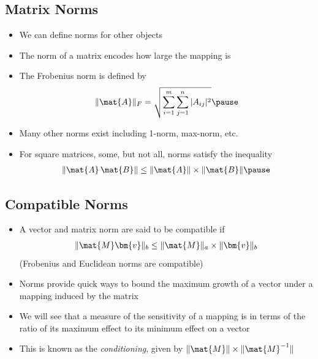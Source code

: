 \begin{slide}
\section[-2]{Matrix Norms}

\begin{PauseHighLight}
  \begin{itemize}
  \item We can define norms for other objects\pause
  \item The norm of a matrix encodes how large the mapping is\pause
  \item The Frobenius norm is defined by
    \begin{align*}
      \| \mat{A} \|_F = \sqrt{\sum_{i=1}^m \sum_{j=1}^n |A_{ij}|^2}\pause
    \end{align*}
  \item Many other norms exist including 1-norm, max-norm, etc.\pause
  \item For square matrices, some, but not all, norms satisfy the
    inequality
    \begin{align*}
      \| \mat{A}\,\mat{B} \| \leq \| \mat{A} \| \times \| \mat{B} \|\pause
    \end{align*}
  \end{itemize}
\end{PauseHighLight}

\end{slide}


\begin{slide}
\section[-2]{Compatible Norms}

\begin{PauseHighLight}
  \begin{itemize}
  \item A vector and matrix norm are said to be compatible if
    \begin{align*}
      \| \mat{M} \bm{v} \|_b \leq \| \mat{M} \|_a \times \| \bm{v} \|_b
    \end{align*}
    (Frobenius and Euclidean norms are compatible)\pause
  \item Norms provide quick ways to bound the maximum growth of a vector
    under a mapping induced by the matrix\pause
  \item We will see that a measure of the sensitivity of a mapping is in
    terms of the ratio of its maximum effect to its minimum effect on a
    vector\pause
  \item This is known as the \emph{conditioning}, given by
    $\|\mat{M}\| \times \|\mat{M}^{-1}\|$\pause
  \end{itemize}
\end{PauseHighLight}


\end{slide}


